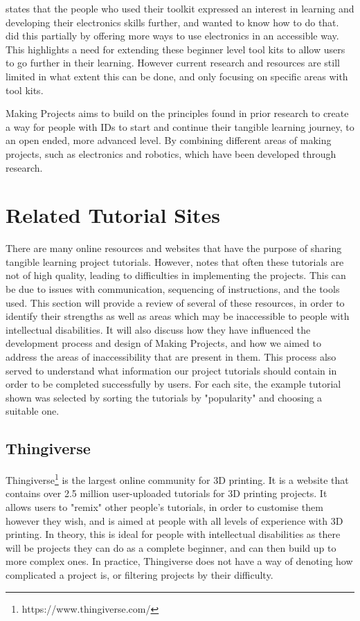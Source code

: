 \documentclass{l4proj}
\begin{document}
\cite{Ell2021} states that the people who used their toolkit expressed an interest in learning and developing their electronics skills further, and wanted to know how to do that. \cite{Sen2022} did this partially by offering more ways to use electronics in an accessible way. This highlights a need for extending these beginner level tool kits to allow users to go further in their learning. However current research and resources are still limited in what extent this can be done, and only focusing on specific areas with tool kits. 

Making Projects aims to build on the principles found in prior research to create a way for people with IDs to start and continue their tangible learning journey, to an open ended, more advanced level. By combining different areas of making projects, such as electronics and robotics, which have been developed through research. 

\section{Related Tutorial Sites}
There are many online resources and websites that have the purpose of sharing tangible learning project tutorials. However, \cite{Wak2015} notes that often these tutorials are not of high quality, leading to difficulties in implementing the projects. This can be due to issues with communication, sequencing of instructions, and the tools used.
This section will provide a review of several of these resources, in order to identify their strengths as well as areas which may be inaccessible to people with intellectual disabilities. It will also discuss how they have influenced the development process and design of Making Projects, and how we aimed to address the areas of inaccessibility that are present in them. This process also served to understand what information our project tutorials should contain in order to be completed successfully by users. For each site, the example tutorial shown was selected by sorting the tutorials by "popularity" and choosing a suitable one. 

\subsection{Thingiverse}
Thingiverse\footnote{https://www.thingiverse.com/} is the largest online community for 3D printing. It is a website that contains over 2.5 million user-uploaded tutorials for 3D printing projects. It allows users to "remix" other people's tutorials, in order to customise them however they wish, and is aimed at people with all levels of experience with 3D printing. In theory, this is ideal for people with intellectual disabilities as there will be projects they can do as a complete beginner, and can then build up to more complex ones. In practice, Thingiverse does not have a way of denoting how complicated a project is, or filtering projects by their difficulty. 
\end{document}
